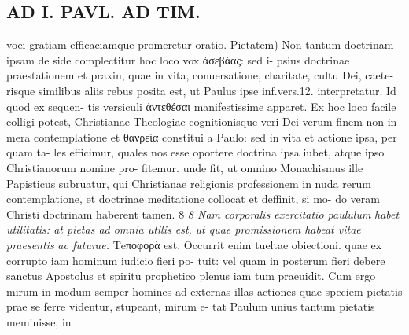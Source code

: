 \documentclass{article}
\begin{document}
\begin{pages}
\section*{AD I. PAVL. AD TIM. }
\marginpar{[ p.206 ]}voei gratiam efficaciamque promeretur oratio. Pietatem) Non tantum doctrinam ipsam de side complectitur hoc loco vox ἀσεβάας: sed i- psius doctrinae praestationem et praxin, quae in vita, conuersatione, charitate, cultu Dei, caete- risque similibus aliis rebus posita est, ut Paulus ipse inf.vers.12. interpretatur. Id quod ex sequen- tis versiculi ἀντεθέσαι manifestissime apparet. Ex hoc loco facile colligi potest, Christianae Theologiae cognitionisque veri Dei verum finem non in mera contemplatione et θανρεία constitui a Paulo: sed in vita et actione ipsa, per quam ta- les efficimur, quales nos esse oportere doctrina ipsa iubet, atque ipso Christianorum nomine pro- fitemur. unde fit, ut omnino Monachismus ille Papisticus subruatur, qui Christianae religionis professionem in nuda rerum contemplatione, et doctrinae meditatione collocat et deffinit, si mo- do veram Christi doctrinam haberent tamen. 8 \textit{8 Nam corporalis exercitatio paululum} \textit{habet utilitatis: at pietas ad omnia utilis est,} \textit{ut quae promissionem habeat vitae praesentis} \textit{ac futurae.} Τeποφορὰ est. Occurrit enim tueltae obiectioni. quae ex corrupto iam hominum iudicio fieri po- tuit: vel quam in posterum fieri debere sanctus Apostolus et spiritu prophetico plenus iam tum praeuidit. Cum ergo mirum in modum semper homines ad externas illas actiones quae speciem pietatis prae se ferre videntur, stupeant, mirum e- tat Paulum unius tantum pietatis meminisse, in 

\end{pages}
\end{document}
